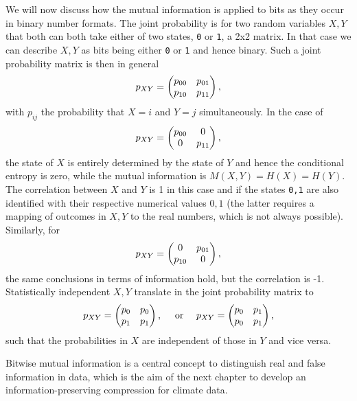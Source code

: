 We will now discuss how the mutual information is applied to bits as they occur in binary number formats. The joint probability
is for two random variables $X,Y$ that both can both take either of two states, \texttt{0} or \texttt{1},
a 2x2 matrix. In that case we can describe $X,Y$ as bits being either \texttt{0} or \texttt{1} and hence binary.
Such a joint probability matrix is then in general
\begin{equation}
	p_{XY} = \begin{pmatrix} p_{00} & p_{01} \\
			p_{10} & p_{11} \end{pmatrix},
\end{equation}
with $p_{ij}$ the probability that $X=i$ and $Y=j$ simultaneously.
In the case of 
\begin{equation}
	p_{XY} = \begin{pmatrix} p_{00} & 0 \\
			0 & p_{11} \end{pmatrix},
\end{equation}
the state of $X$ is entirely determined by the state of $Y$ and hence the conditional entropy is zero, while the mutual information
is $M(X,Y) = H(X) = H(Y)$. The correlation between $X$ and $Y$ is 1 in this case and if the states \texttt{0,1} are also identified
with their respective numerical values $0,1$ (the latter requires a mapping of outcomes in $X,Y$ to the real numbers, which 
is not always possible). Similarly, for
\begin{equation}
	p_{XY} = \begin{pmatrix} 0 & p_{01} \\
			p_{10} & 0 \end{pmatrix},
\end{equation}
the same conclusions in terms of information hold, but the correlation is -1. Statistically independent $X,Y$ translate in the joint
probability matrix to
\begin{equation}
	p_{XY} = \begin{pmatrix} p_0 & p_0 \\
			p_1 & p_1 \end{pmatrix},
	\quad \text{ or } \quad
	p_{XY} = \begin{pmatrix} p_0 & p_1 \\
			p_0 & p_1 \end{pmatrix},
\end{equation}
such that the probabilities in $X$ are independent of those in $Y$ and vice versa.

Bitwise mutual information is a central concept to distinguish real and false information in data, which is the aim of the next chapter
to develop an information-preserving compression for climate data.
